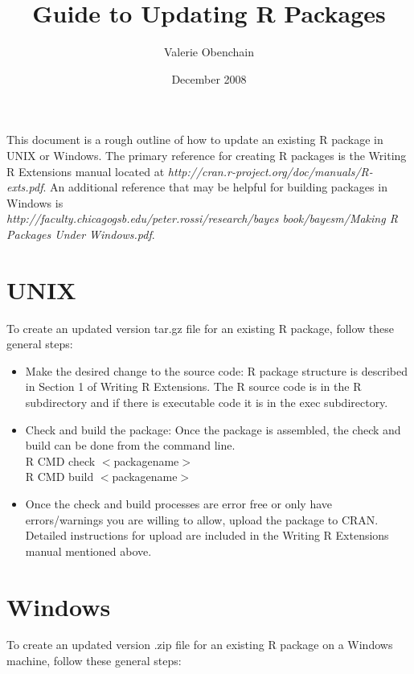 \documentclass[12pt]{article}
\title{Guide to Updating R Packages}
\author{Valerie Obenchain}
\date{December 2008}
\begin{document}
\maketitle			


\noindent This document is a rough outline of how to update an existing R package in UNIX or 
Windows. The primary reference for creating R packages is the Writing R Extensions manual located at
\emph{http://cran.r-project.org/doc/manuals/R-exts.pdf}. An additional reference that may be helpful for building packages in Windows is\\
 \emph{http://faculty.chicagogsb.edu/peter.rossi/research/bayes book/bayesm/Making R Packages Under Windows.pdf}.

\section{UNIX}

To create an updated version tar.gz file for an existing R package, follow these general steps:
\begin{itemize}
\item {Make the desired change to the source code: R package structure is described in Section 1 of Writing R Extensions. The R source code is in the R subdirectory and if there is executable code it is in the exec subdirectory.}

\item {Check and build the package: Once the package is assembled, the check and build can be done from
the command line. \\
R CMD check $<$packagename$>$\\
R CMD build $<$packagename$>$}
\item {Once the check and build processes are error free or only have errors/warnings you are willing to allow, upload the package to CRAN. Detailed
instructions for upload are included in the Writing R Extensions manual mentioned above.}
\end{itemize} 



\section{Windows}
To create an updated version .zip file for an existing R package on a Windows machine, follow these general steps:
\end{document}

